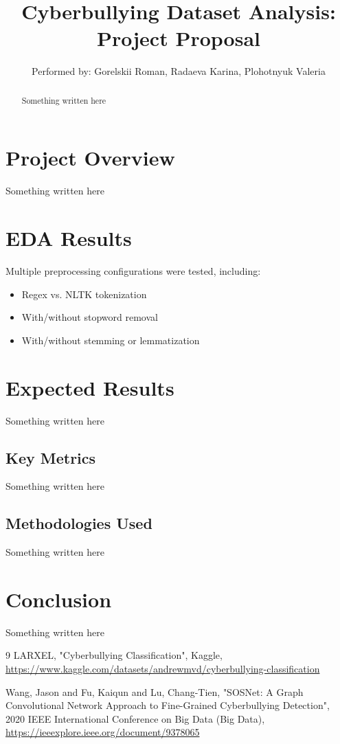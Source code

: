 \documentclass[11pt]{article}
\title{Cyberbullying Dataset Analysis: Project Proposal}
\author{Performed by: Gorelskii Roman, Radaeva Karina, Plohotnyuk Valeria}
\begin{document}
\maketitle

\begin{abstract}
Something written here
\end{abstract}

\section{Project Overview}
Something written here

\section{EDA Results}
Multiple preprocessing configurations were tested, including:
\begin{itemize}
    \item Regex vs. NLTK tokenization
    \item With/without stopword removal
    \item With/without stemming or lemmatization
\end{itemize}

\section{Expected Results}
Something written here

\subsection{Key Metrics}
Something written here

\subsection{Methodologies Used}
Something written here

\section{Conclusion}
Something written here

\begin{thebibliography}{9}
LARXEL, "Cyberbullying Classification", Kaggle, \url{https://www.kaggle.com/datasets/andrewmvd/cyberbullying-classification}

Wang, Jason and Fu, Kaiqun and Lu, Chang-Tien, "SOSNet: A Graph Convolutional Network Approach to Fine-Grained Cyberbullying Detection", 2020 IEEE International Conference on Big Data (Big Data),
\url{https://ieeexplore.ieee.org/document/9378065}
\end{thebibliography}
\end{document}
